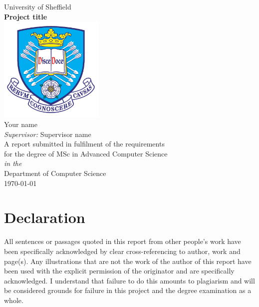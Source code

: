 \documentclass[11pt,oneside]{book}
\begin{document}
\frontmatter

\begin{titlepage}


\begin{center}
{\LARGE University of Sheffield}\\[1.5cm]
\linespread{1.2}\huge {\bfseries Project title}\\[1.5cm]
\linespread{1}
\includegraphics[width=5cm]{images/tuoslogo.png}\\[1cm]
{\Large Your name}\\[1cm]
{\large \emph{Supervisor:} Supervisor name}\\[1cm]
\large A report submitted in fulfilment of the requirements\\ for the degree of MSc in Advanced Computer Science\\[0.3cm] 
\textit{in the}\\[0.3cm]
Department of Computer Science\\[2cm]
\today
\end{center}

\end{titlepage}


\newpage
\chapter*{\Large Declaration}


All sentences or passages quoted in this report from other people's work have been specifically acknowledged by clear cross-referencing to author, work and page(s). Any illustrations that are not the work of the author of this report have been used with the explicit permission of the originator and are specifically acknowledged. I understand that failure to do this amounts to plagiarism and will be considered grounds for failure in this project and the degree examination as a whole.\\[1cm]
\end{document}
